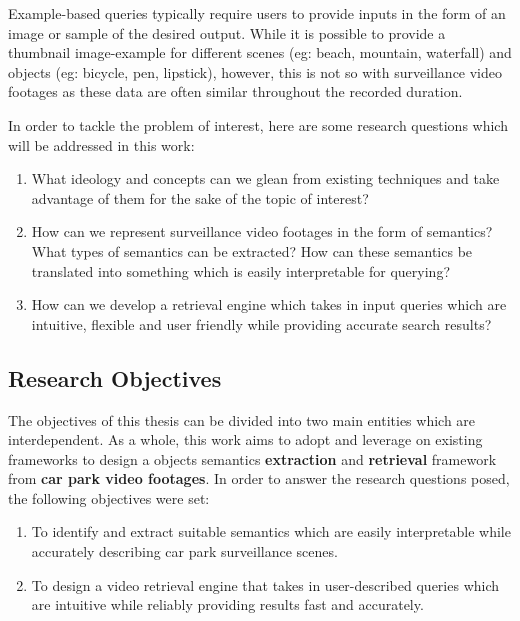 Example-based queries typically require users to provide inputs in the form of an image or sample of the desired output. While it is possible to provide a thumbnail image-example for different scenes (eg: beach, mountain, waterfall) and objects (eg: bicycle, pen, lipstick), however, this is not so with surveillance video footages as these data are often similar throughout the recorded duration. 

In order to tackle the problem of interest, here are some research questions which will be addressed in this work:
\begin{enumerate}  
\item What ideology and concepts can we glean from existing techniques and take advantage of them for the sake of the topic of interest? 
\item How can we represent surveillance video footages in the form of semantics? What types of semantics can be extracted? How can these semantics be translated into something which is easily interpretable for querying?
\item How can we develop a retrieval engine which takes in input queries which are intuitive, flexible and user friendly while providing accurate search results? 
\end{enumerate}



\subsection{Research Objectives}
The objectives of this thesis can be divided into two main entities which are interdependent. As a whole, this work aims to adopt and leverage on existing frameworks to design a objects semantics \textbf{extraction} and \textbf{retrieval} framework from \textbf{car park video footages}. In order to answer the research questions posed, the following objectives were set:

\begin{enumerate}  
\item To identify and extract suitable semantics which are easily interpretable while accurately describing car park surveillance scenes.
\item To design a video retrieval engine that takes in user-described queries which are intuitive while reliably providing results fast and accurately. 
\end{enumerate}

